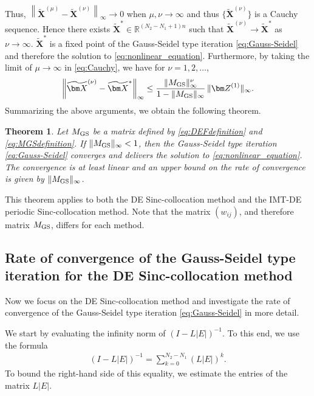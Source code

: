 \documentclass[pdflatex,sn-mathphys-num]{sn-jnl}%
\theoremstyle{thmstyleone}%
\newtheorem{theorem}{Theorem}%
\theoremstyle{thmstyletwo}%
\theoremstyle{thmstylethree}%
\begin{document}
Thus, $\left\|\widetilde{\bm X}^{(\mu)}-\widetilde{\bm X}^{(\nu)}\right\|_{\infty}\rightarrow 0$ when $\mu,\nu\rightarrow\infty$ and thus $\{\widetilde{\bm X}^{(\nu)}\}$ is a Cauchy sequence. Hence there exists $\widetilde{\bm X}^*\in\mathbb{R}^{(N_2-N_1+1)n}$ such that $\widetilde{\bm X}^{(\nu)}\rightarrow\widetilde{\bm X}^*$ as $\nu\rightarrow\infty$. $\widetilde{\bm X}^*$ is a fixed point of the Gauss-Seidel type iteration \eqref{eq:Gauss-Seidel} and therefore the solution to \eqref{eq:nonlinear_equation}. Furthermore, by taking the limit of $\mu\rightarrow\infty$ in \eqref{eq:Cauchy}, we have for $\nu=1, 2, \ldots$,
\begin{equation}
\left\|\widetilde{\bm X}^{(\nu)}-\widetilde{\bm X}^*\right\|_{\infty} \le \frac{\|M_{\rm GS}\|_{\infty}^{\nu}}{1-\|M_{\rm GS}\|_{\infty}}\,\|{\bm Z}^{(1)}\|_{\infty}.
\end{equation}
Summarizing the above arguments, we obtain the following theorem.
\begin{theorem}
\label{Th3-1}
Let $M_{\rm GS}$ be a matrix defined by \eqref{eq:DEFdefinition} and \eqref{eq:MGSdefinition}. If $\|M_{\rm GS}\|_{\infty}<1$, then the Gauss-Seidel type iteration \eqref{eq:Gauss-Seidel} converges and delivers the solution to \eqref{eq:nonlinear_equation}. The convergence is at least linear and an upper bound on the rate of convergence is given by $\|M_{\rm GS}\|_{\infty}$.
\end{theorem}
This theorem applies to both the DE Sinc-collocation method and the IMT-DE periodic Sinc-collocation method. Note that the matrix $(w_{ij})$, and therefore matrix $M_{\rm GS}$, differs for each method.



\subsection{Rate of convergence of the Gauss-Seidel type iteration for the DE Sinc-collocation method}
\label{convergence_rate}
Now we focus on the DE Sinc-collocation method and investigate the rate of convergence of the Gauss-Seidel type iteration \eqref{eq:Gauss-Seidel} in more detail.

We start by evaluating the infinity norm of $(I - L|E|)^{-1}$. 
To this end, 
we use the formula 
\begin{align}
(I - L |E|)^{-1} = \sum_{k=0}^{N_{2} - N_{1}} (L |E|)^{k}. 
\label{eq:formula_inverse_I_LE}
\end{align}
To bound the right-hand side of this equality, 
we estimate the entries of the matrix $L|E|$. 
\end{document}
